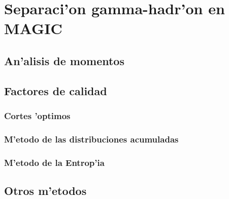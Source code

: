 

\chapter{Separaci'on gamma-hadr'on en MAGIC}
\label{chapter:ghsep}

\section{An'alisis de momentos}

\section{Factores de calidad}

\subsection{Cortes 'optimos}

\subsection{M'etodo de las distribuciones acumuladas}

\subsection{M'etodo de la Entrop'ia}

\section{Otros m'etodos}

\endinput
%

